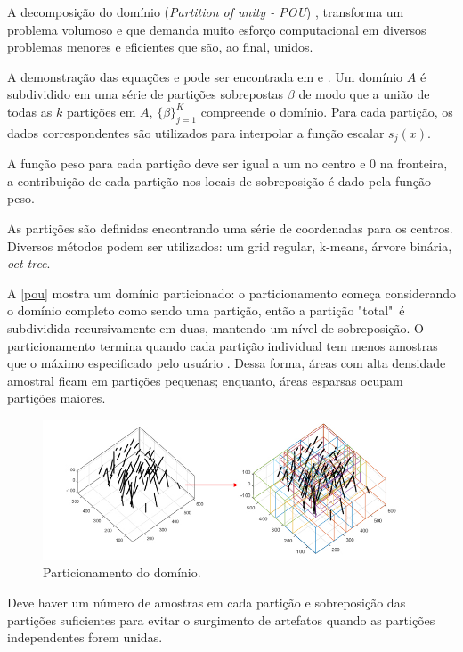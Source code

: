 A decomposição do domínio (\textit{Partition of unity - POU}) \cite{wendland2004scattered}, transforma um problema volumoso e que demanda muito esforço computacional em diversos problemas menores e eficientes que são, ao final, unidos.

A demonstração das equações e pode ser encontrada em  e . Um domínio $A$ é subdividido em uma série de partições sobrepostas $\beta$ de modo que a união de todas as $k$ partições em $A$, $\{ \beta \}^K_{j=1}$ compreende o domínio. Para cada partição, os dados correspondentes são utilizados para interpolar a função escalar $s_j(x)$.

A função peso para cada partição deve ser igual a um no centro e 0 na fronteira, a contribuição de cada partição nos locais de sobreposição é dado pela função peso.

As partições são definidas encontrando uma série de coordenadas para os centros. Diversos métodos podem ser utilizados: um grid regular, k-means, árvore binária, \textit{oct tree}.

A \autoref{pou} mostra um domínio particionado: o particionamento começa considerando o domínio completo como sendo uma partição, então a partição "total"\ é subdividida recursivamente em duas, mantendo um nível de sobreposição. O particionamento termina quando cada partição individual tem menos amostras que o máximo especificado pelo usuário \cite{martin2017implicitmodeling, martin2017iterative}. Dessa forma, áreas com alta densidade amostral ficam em partições pequenas; enquanto, áreas esparsas ocupam partições maiores.

\begin{figure}[H]
	\caption{\label{pou}Particionamento do domínio.}
	\centering
		\includegraphics[width=\textwidth]{capitulo_2/imagens/pou.jpg}
\end{figure}

Deve haver um número de amostras em cada partição e sobreposição das partições suficientes para evitar o surgimento de artefatos quando as partições independentes forem unidas.

